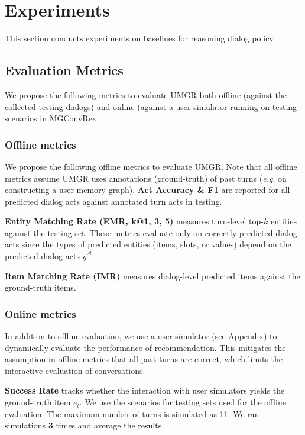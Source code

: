 \documentclass[11pt,a4paper]{article}
\makeatletter
\DeclareRobustCommand\onedot{\futurelet\@let@token\@onedot}
\def\onedot{. }
\def\eg{\emph{e.g}\onedot} \def\Eg{\emph{E.g}\onedot}
\makeatother
\begin{document}
\section{Experiments}
\label{sec:exp}
This section conducts experiments on baselines for reasoning dialog policy.

\subsection{Evaluation Metrics}
We propose the following metrics to evaluate UMGR both offline (against the collected testing dialogs) and online (against a user simulator running on testing scenarios in MGConvRex.

\subsubsection{Offline metrics}
We propose the following offline metrics to evaluate UMGR. Note that all offline metrics assume UMGR uses annotations (ground-truth) of past turns (\eg on constructing a user memory graph).
\noindent \textbf{Act Accuracy \& F1} are reported for all predicted dialog acts against annotated turn acts in testing.

\noindent \textbf{Entity Matching Rate (EMR, k@1, 3, 5)} measures turn-level top-$k$ entities against the testing set. 
These metrics evaluate only on correctly predicted dialog acts since the types of predicted entities (items, slots, or values) depend on the predicted dialog acts $\hat{y}^\mathcal{A}$.

\noindent \textbf{Item Matching Rate (IMR)} measures dialog-level predicted items against the ground-truth items.

\subsubsection{Online metrics}
In addition to offline evaluation, we use a user simulator (see Appendix) to dynamically evaluate the performance of recommendation. This mitigates the assumption in offline metrics that all past turns are correct, which limits the interactive evaluation of conversations.

\noindent \textbf{Success Rate} tracks whether the interaction with user simulators yields the ground-truth item $e_t$. We use the scenarios for testing sets used for the offline evaluation. The maximum number of turns is simulated as 11. We ran simulations \textbf{3} times and average the results.
\end{document}
